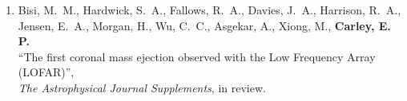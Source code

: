 \begin{enumerate}
\item Bisi, M.~M., Hardwick, S.~A., Fallows, R.~A., Davies, J.~A., Harrison, R.~A., Jensen, E.~A., Morgan, H.,
Wu, C.~C., Asgekar, A.,  Xiong, M.,  {\bf Carley, E. P.} \\
``The first coronal mass ejection observed with the Low Frequency Array (LOFAR)'', \\
\emph{The Astrophysical Journal Supplements}, in review.

\end{enumerate}

